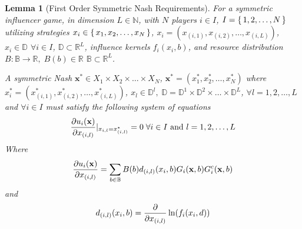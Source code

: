 \documentclass{article}
\newtheorem{lemma}[theorem]{Lemma}
\newcommand {\R}{\mathbb{R}}
\newcommand {\N}{\mathbb{N}}
\newcommand {\D}{\mathbb{D}}
\newcommand {\B}{\mathbb{B}}
\begin{document}
            \begin{lemma}[First Order Symmetric Nash Requirements]\label{lem:SI_requirements}
                    For a symmetric influencer game, in dimension $L\in \N$, with $N$ players $i\in I$, $I=\set{1,2,\dots,N}$ utilizing strategies $x_i\in \set{x_1,x_2,\dots,x_N}$, $x_i=(x_{(i,1)},x_{(i,2)},\dots,x_{(i,L)})$, $x_i\in\D$ $\forall i\in I$, $\D\subset \R^L$, influence kernels $f_i(x_i,b)$, and resource distribution $B:\B\to \R, \; B(b)\in \R$ $\B\subset \R^L$. 
                    
                    A symmetric Nash $\mathbf{x^*}\in X_1\times X_2\times \dots\times X_N$, $\mathbf{x}^*=(x_1^*,x_2^*,\dots, x_N^*)$ where $x^*_i=(x_{(i,1)}^*,x_{(i,2)}^*,\dots, x_{(i,L)}^*)$, $x_l\in\D^l,\; \D=\D^1\times \D^2\times \dots \times \D^L$, $\forall l=1,2,\dots,L$ and $\forall i\in I$ must satisfy the following system of equations
                    \begin{equation}
                         \pdv{u_i(\mathbf{x})}{x_{(i,l)}}|_{x_{i,l}=x_{(i,l)}^*}=0 \; \forall i\in I \text{ and } l=1,2,\dots,L
                    \end{equation}
                    Where
                    \begin{equation}
                       \pdv{u_i(\mathbf{x})}{x_{(i,l)}}= \sum_{b\in \B} B(b)d_{(i,l)}(x_{i},b)G_i(\mathbf{x},b)G_i^c(\mathbf{x},b)
                    \end{equation}
                    and 
                    \begin{equation}
                        d_{(i,l)}(x_{i},b)=\pdv{}{x_{(i,l)}}\ln(f_i(x_{i},d))
                    \end{equation}
                    
            \end{lemma}
\end{document}
